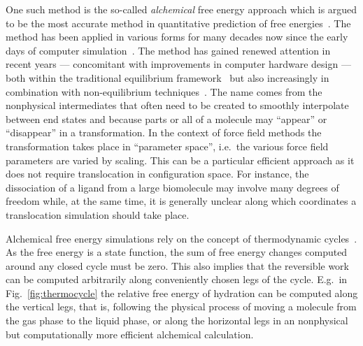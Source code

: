 \documentclass[journal=jctcce,manuscript=article]{achemso}
\begin{document}
One such method is the so-called \emph{alchemical} free energy
approach which is argued to be the most accurate method in quantitative
prediction of free energies~\cite{Beveridge-citeulike:3789890,
  straatsma:92, doi:10.1021/cr00023a004, hansen_practical_2014}.  The
method has been applied in various forms for many decades now since
the early days of computer simulation~\cite{doi:10.1063/1.1671118,
  bennett_efficient_1976, doi:10.1063/1.432264, FS9821700055,
  Tembe1984281, doi:10.1063/1.449208}.  The method has gained renewed
attention in recent years --- concomitant with improvements in
computer hardware design --- both within the traditional equilibrium
framework~\cite{GILSON19971047, doi:10.1021/jp0217839,
  deng_computations_2009} but also increasingly in combination with
non-equilibrium techniques~\cite{ytreberg_comparison_2006, JCC:JCC23804,
  doi:10.1021/ct500964e}.  The name comes from the nonphysical
intermediates that often need to be created to smoothly interpolate
between end states and because parts or all of a molecule may ``appear''
or ``disappear'' in a transformation.  In the context of force field
methods the transformation takes place in ``parameter space'', i.e.\ the
various force field parameters are varied by scaling.  
This can be a particular efficient approach as it does not require 
translocation in configuration space.
For instance, the dissociation of a ligand from
a large biomolecule may involve many degrees of freedom while, at the
same time, it is generally unclear along which coordinates a
translocation simulation should take place.

Alchemical free energy simulations rely on the concept of thermodynamic cycles~\cite{Tembe1984281}.
As the free energy is a state function, the sum of free energy changes
computed around any closed cycle must be zero.  This also implies
that the reversible work can be computed arbitrarily along
conveniently chosen legs of the cycle.  E.g.\ in
Fig.~\ref{fig:thermocycle} the relative free energy of hydration can
be computed along the vertical legs, that is, following the physical
process of moving a molecule from the gas phase to the liquid phase,
or along the horizontal legs in an nonphysical but computationally more
efficient alchemical calculation.
\end{document}
